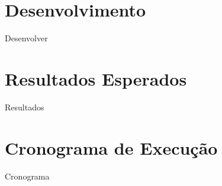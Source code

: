 \documentclass[12pt]{article}
\begin{document}
\section{Desenvolvimento} \label{sec:firstpage}

Desenvolver

\section{Resultados Esperados}

Resultados

\section{Cronograma de Execução}

Cronograma





\end{document}
